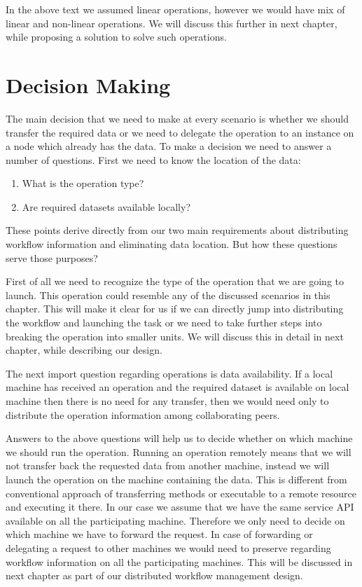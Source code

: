 In the above text we assumed linear operations, however we would have mix of linear and non-linear operations. 
We will discuss this further in next chapter, while proposing a solution to solve such operations.

\section{Decision Making}
The main decision that we need to make at every scenario is whether we should transfer the required data or we
need to delegate the operation to an instance on a node which already has the data. To make a decision we need to
answer a number of questions. First we need to know the location of the data:

\begin{enumerate}
\item What is the operation type?
\item Are required datasets available locally?
\end{enumerate}

These points derive directly from our two main requirements about distributing workflow information and 
eliminating data location. But how these questions serve those purposes?

First of all we need to recognize the type of the operation that we are going to launch. This operation could
resemble any of the discussed scenarios in this chapter. This will make it clear for us if we can directly
jump into distributing the workflow and launching the task or we need to take further steps into breaking
the operation into smaller units. We will discuss this in detail in next chapter, while describing our design.

The next import question regarding operations is data availability. If a local machine has received an operation
and the required dataset is available on local machine then there is no need for any transfer, then we would need
only to distribute the operation information among collaborating peers.

Answers to the above questions will help us to decide whether on which machine we should run the operation. Running an
operation remotely means that we will not transfer back the requested data from another machine, instead we will launch
the operation on the machine containing the data. This is different from conventional approach of transferring methods
or executable to a remote resource and executing it there. In our case we assume that we have the same service API 
available on all the participating machine. Therefore we only need to decide on which machine we have to forward
the request. In case of forwarding or delegating a request to other machines we would need to preserve regarding
workflow information on all the participating machines. This will be discussed in next chapter as part of our
distributed workflow management design.


